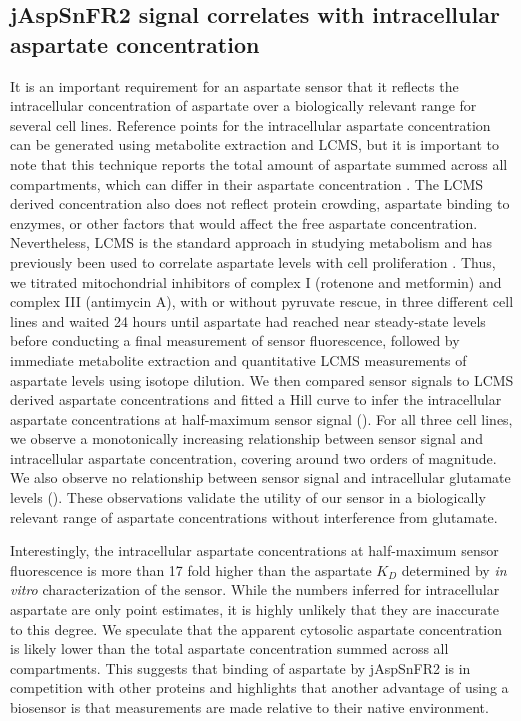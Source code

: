 \documentclass[9pt,lineno]{elife}
\begin{document}
\subsection{jAspSnFR2 signal correlates with intracellular aspartate concentration}
It is an important requirement for an aspartate sensor that it reflects the intracellular concentration of aspartate over a biologically relevant range for several cell lines.
Reference points for the intracellular aspartate concentration can be generated using metabolite extraction and LCMS, but it is important to note that this technique reports the total amount of aspartate summed across all compartments, which can differ in their aspartate concentration \citep{Chen2016-mf}.
The LCMS derived concentration also does not reflect protein crowding, aspartate binding to enzymes, or other factors that would affect the free aspartate concentration.
Nevertheless, LCMS is the standard approach in studying metabolism and has previously been used to correlate aspartate levels with cell proliferation \citep{Gui2016-ca, Hart2023-gp}.
Thus, we titrated mitochondrial inhibitors of complex I (rotenone and metformin) and complex III (antimycin A), with or without pyruvate rescue, in three different cell lines and waited 24 hours until aspartate had reached near steady-state levels before conducting a final measurement of sensor fluorescence, followed by immediate metabolite extraction and quantitative LCMS measurements of aspartate levels using isotope dilution.
We then compared sensor signals to LCMS derived aspartate concentrations and fitted a Hill curve to infer the intracellular aspartate concentrations at half-maximum sensor signal ().
For all three cell lines, we observe a monotonically increasing relationship between sensor signal and intracellular aspartate concentration, covering around two orders of magnitude.
We also observe no relationship between sensor signal and intracellular glutamate levels ().
These observations validate the utility of our sensor in a biologically relevant range of aspartate concentrations without interference from glutamate.

Interestingly, the intracellular aspartate concentrations at half-maximum sensor fluorescence is more than 17 fold higher than the aspartate $K_D$ determined by \textit{in vitro} characterization of the sensor.
While the numbers inferred for intracellular aspartate are only point estimates, it is highly unlikely that they are inaccurate to this degree. 
We speculate that the apparent cytosolic aspartate concentration is likely lower than the total aspartate concentration summed across all compartments.
This suggests that binding of aspartate by jAspSnFR2 is in competition with other proteins and highlights that another advantage of using a biosensor is that measurements are made relative to their native environment.
\end{document}
